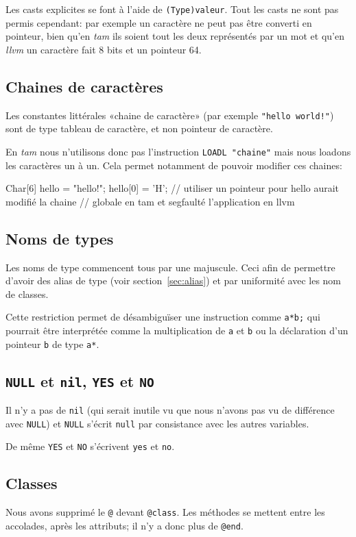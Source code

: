 \documentclass{scrartcl}
\newcommand{\llvm}{\textit{llvm}}
\newcommand{\tam} {\textit{tam}}
\begin{document}
      Les casts explicites se font à l'aide de \verb+(Type)valeur+. Tout les
      casts ne sont pas permis cependant: par exemple un caractère ne peut pas
      être converti en pointeur, bien qu'en \tam{} ils soient tout les deux
      représentés par un mot et qu'en \llvm{} un caractère fait 8 bits et un
      pointeur 64.

    \subsection{Chaines de caractères}
      Les constantes littérales «chaine de caractère» (par exemple
      \verb+"hello world!"+) sont de type tableau de caractère, et non pointeur
      de caractère.

      En \tam{} nous n'utilisons donc pas l'instruction \verb+LOADL "chaine"+
      mais nous loadons les caractères un à un. Cela permet notamment de
      pouvoir modifier ces chaines:
      \begin{moccode}
Char[6] hello = "hello!";
hello[0] = 'H'; // utiliser un pointeur pour hello aurait modifié la chaine
                // globale en tam et segfaulté l'application en llvm
      \end{moccode}

  \subsection{Noms de types}
    Les noms de type commencent tous par une majuscule. Ceci afin de permettre
    d'avoir des alias de type (voir section~\ref{sec:alias}) et par uniformité
    avec les nom de classes.

    Cette restriction permet de désambiguïser une instruction comme
    \verb+a*b;+ qui pourrait être interprétée comme la multiplication de
    \verb+a+ et \verb+b+ ou la déclaration d'un pointeur \verb+b+ de type
    \verb+a*+.

  \subsection{\texttt{NULL} et \texttt{nil}, \texttt{YES} et \texttt{NO}}
    Il n'y a pas de \verb+nil+ (qui serait inutile vu que nous n'avons pas vu
    de différence avec \verb+NULL+) et \verb+NULL+ s'écrit \verb+null+ par
    consistance avec les autres variables.

    De même \verb+YES+ et \verb+NO+ s'écrivent \verb+yes+ et \verb+no+.

  \subsection{Classes}
    Nous avons supprimé le \verb+@+ devant \verb+@class+. Les méthodes se
    mettent entre les accolades, après les attributs; il n'y a donc plus de
    \verb+@end+.
\end{document}

